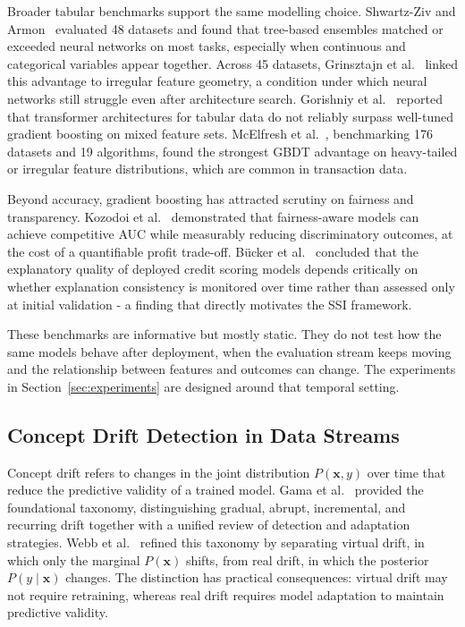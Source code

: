 \documentclass[pdflatex,sn-mathphys-num]{sn-jnl}
\theoremstyle{thmstyleone}
\theoremstyle{thmstyletwo}
\theoremstyle{thmstylethree}
\begin{document}
Broader tabular benchmarks support the same modelling choice. Shwartz-Ziv and
Armon~\cite{shwartzziv2022tabular} evaluated 48 datasets and found that
tree-based ensembles matched or exceeded neural networks on most tasks,
especially when continuous and categorical variables appear together. Across 45
datasets, Grinsztajn et al.~\cite{grinsztajn2022why} linked this advantage to
irregular feature geometry, a condition under which neural networks still
struggle even after architecture search. Gorishniy et
al.~\cite{gorishniy2021revisiting} reported that transformer architectures for
tabular data do not reliably surpass well-tuned gradient boosting on mixed
feature sets. McElfresh et al.~\cite{mcelfresh2023tabular}, benchmarking 176
datasets and 19 algorithms, found the strongest GBDT advantage on heavy-tailed
or irregular feature distributions, which are common in transaction data.

Beyond accuracy, gradient boosting has attracted scrutiny on fairness and
transparency. Kozodoi et al.~\cite{kozodoi2022fairness} demonstrated that
fairness-aware models can achieve competitive AUC while measurably reducing
discriminatory outcomes, at the cost of a quantifiable profit trade-off.
B{\"u}cker et al.~\cite{bucker2022transparency} concluded that the explanatory
quality of deployed credit scoring models depends critically on whether
explanation consistency is monitored over time rather than assessed only at
initial validation - a finding that directly motivates the SSI framework.

These benchmarks are informative but mostly static. They do not test how the
same models behave after deployment, when the evaluation stream keeps moving
and the relationship between features and outcomes can change. The experiments
in Section~\ref{sec:experiments} are designed around that temporal setting.

\subsection{Concept Drift Detection in Data Streams}
\label{sec:related:drift}

Concept drift refers to changes in the joint distribution $P(\mathbf{x}, y)$
over time that reduce the predictive validity of a trained model. Gama et
al.~\cite{gama2014drift} provided the foundational taxonomy, distinguishing
gradual, abrupt, incremental, and recurring drift together with a unified review
of detection and adaptation strategies. Webb et al.~\cite{webb2016drift} refined
this taxonomy by separating virtual drift, in which only the marginal
$P(\mathbf{x})$ shifts, from real drift, in which the posterior
$P(y \mid \mathbf{x})$ changes. The distinction has practical consequences:
virtual drift may not require retraining, whereas real drift requires model
adaptation to maintain predictive validity.
\end{document}

